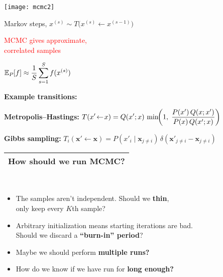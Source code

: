\documentclass[25pt,landscape]{foils}
\newcommand{\Red}{\textcolor{red}}
\newcommand{\Gray}{\textcolor{mygray}}
\newcommand{\Green}{\textcolor{mypine}}
\newcommand{\myfoilhead}[1]{
\newpage
\vspace*{-1cm}
\Gray{
\begin{tabular*}{\textwidth}{l}
{\bf \Huge #1} \\
\bottomrule
\end{tabular*}}}
\newcommand{\ave}[2]{{\mathbb E}_{#1}\kern-2pt\left[ #2 \right]}
\newcommand{\bx}{\mathbf{x}}
\newcommand{\la}{\!\leftarrow\!}
\newcommand{\g}{\!\mid\!} %
\begin{document}
\hspace*{-1cm}
\begin{minipage}{0.5\linewidth}
\centerline{\texttt{[image: mcmc2]}}
\vspace*{1cm}
\end{minipage}
\begin{minipage}{0.6\linewidth}
    Markov steps, $x^{(s)}\sim T\big(x^{(s)}\la x^{(s-1)}\big)$

\vspace*{1cm}

\Red{MCMC gives approximate,\\correlated samples}

\vspace*{1cm}

$\displaystyle \ave{P}{f} \approx \frac{1}{S} \sum_{s=1}^S f(x^{(s)})$
\end{minipage}

\vfill

\Green{\bf Example transitions:}

\bigskip

\textbf{Metropolis--Hastings:} $\displaystyle T(x'\la x) = Q(x'; x) \, \min\kern-3pt\left( 1,\;
\frac{P(x')\,Q(x;x')}{P(x)\,Q(x';x)}\right)$

\bigskip
\bigskip

\textbf{Gibbs sampling:} $\displaystyle T_i(\bx'\la \bx) = P(x'_i\g \bx_{j\neq i}) \, \delta( \bx'_{j\neq i} - \bx_{j\neq i})$



\myfoilhead{How should we run MCMC?}

\vfill

\begin{minipage}{0.05\linewidth}
    ~
\end{minipage}
\begin{minipage}{0.9\linewidth}
\begin{itemize}
    \setlength{\itemsep}{10pt}
    \setlength{\parskip}{5pt}
    \setlength{\parsep}{0cm}
    \item The samples aren't independent. Should we \Green{\bf thin},\\
        only keep every $K$th sample?
    \item Arbitrary initialization means starting iterations are bad.\\
        Should we discard a \Green{\bf ``burn-in'' period}?
    \item Maybe we should perform \Green{\bf multiple runs?}
    \item How do we know if we have run for \Green{\bf long enough?}
\end{itemize}
\end{minipage}
\vspace*{-2.5cm}
\vfill
{}
\vspace*{-0.7cm}
\end{document}
